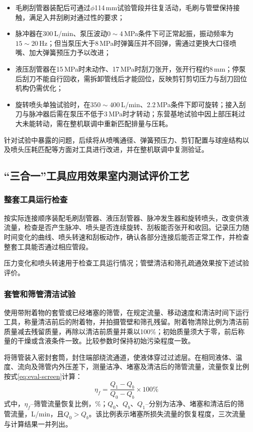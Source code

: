 \begin{itemize}
	\item 毛刷刮管器装配后可通过$\phi$114\,mm试验管段并往复活动，毛刷与管壁保持接触，满足入井刮刷对通过性的要求；
	\item 脉冲器在300\,L/min、泵压波动$0\sim4$\,MPa条件下可正常起振，振动频率为$15\sim20$\,Hz；但当泵压大于8\,MPa时弹簧压并不回弹，需通过更换大口径喷嘴、加大弹簧预压力予以改进；
	\item 液压刮管器在15\,MPa时未动作、17\,MPa时刮刀张开，张开行程约8\,mm；停泵后刮刀不能自行回收，需拆卸管线后才能回位，反映剪钉剪切压力与刮刀回位机构仍需优化；
	\item 旋转喷头单独试验时，在$350\sim400$\,L/min、2.2\,MPa条件下即可旋转；接入刮刀与脉冲器后需在泵压不低于3\,MPa时才转动；东营基地试验中因上部压耗过大未能转动，需在整机联调中重新匹配排量与压耗。
\end{itemize}

针对试验中暴露的问题，后续将从喷嘴通径、弹簧预压力、剪钉配置与球座结构以及喷头压耗匹配等方面对工具进行改进，并在整机联调中复测验证。

\subsection{“三合一”工具应用效果室内测试评价工艺}
\label{sec:eval-3in1}

\subsubsection{整套工具运行检查}
按实际连接顺序装配毛刷刮管器、液压刮管器、脉冲发生器和旋转喷头，改变供液流量，检查是否产生脉冲、喷头是否连续旋转、刮板能否张开和收回。记录压力随时间变化的曲线、喷头转速和刮板动作，确认各部分连接后能否正常工作，并检查整套工具能否通过相应管段。

压力变化和喷头转速用于检查工具运行情况；管壁清洁和筛孔疏通效果按下述试验评价。

\subsubsection{套管和筛管清洁试验}
使用带附着物的套管或已经堵塞的筛管，在规定流量、移动速度和清洁时间下运行工具，称量清洁前后的附着物，并拍摄管壁和筛孔残留。附着物清除比例为清洁前质量减去残留质量，再除以清洁前质量并乘以100\%；初始质量须大于零，前后称量的干燥或含液条件一致。比较参数时保持初始污染程度一致。

将筛管装入密封套筒，封住端部绕流通道，使液体穿过过滤层。在相同液体、温度、流向及筛管内外压差下，测量洁净、堵塞及清洁后的筛管流量，流量恢复比例按式\eqref{eq:eval-screen}计算：
\begin{equation}
	\eta_f=\frac{Q_1-Q_b}{Q_0-Q_b}\times 100\%
	\label{eq:eval-screen}
\end{equation}
式中，$\eta_f$--筛管流量恢复比例，\%；$Q_0$、$Q_b$、$Q_1$--分别为洁净、堵塞和清洁后的筛管流量，L/min，且$Q_0>Q_b$。该比例表示堵塞所损失流量的恢复程度，三次流量与计算结果一并列出。


